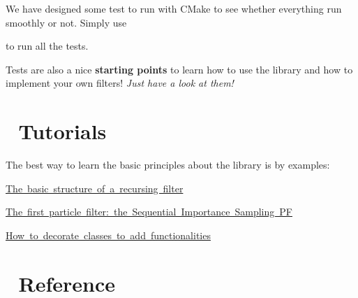  We have designed some test to run with {\ttfamily C\+Make} to see whether everything run smoothly or not. Simply use 
 to run all the tests.

Tests are also a nice {\bfseries starting points} to learn how to use the library and how to implement your own filters! {\itshape Just have a look at them!}\hypertarget{index_tutorials}{}\section{📘 Tutorials}\label{index_tutorials}


 The best way to learn the basic principles about the library is by examples\+:
\begin{DoxyItemize}
\item \mbox{\hyperlink{basic-structure-recursive-filter}{The basic structure of a recursing filter}}
\item \mbox{\hyperlink{sis-pf}{The first particle filter\+: the Sequential Importance Sampling PF}}
\item \mbox{\hyperlink{decorate-classes}{How to decorate classes to add functionalities}}
\end{DoxyItemize}\hypertarget{index_reference}{}\section{📑 Reference}\label{index_reference}


